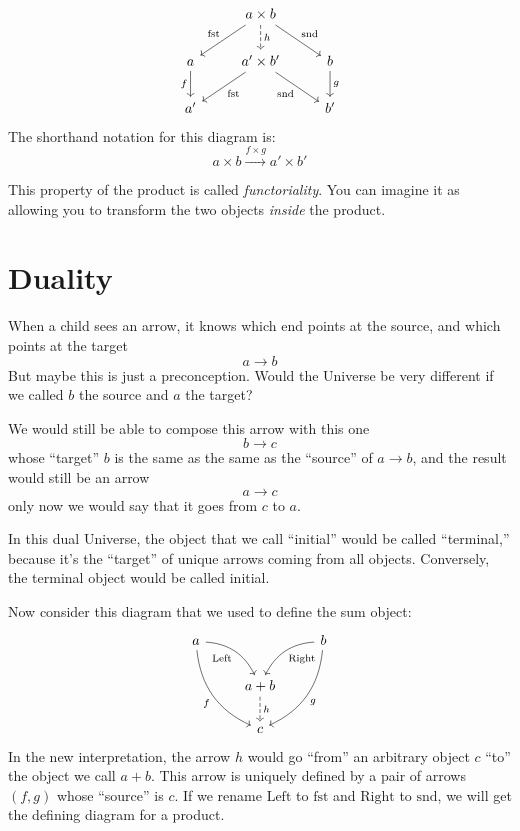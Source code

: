\documentclass[DaoFP]{subfiles}
\begin{document}
\[
 \begin{tikzcd}
 & a \times b
\arrow[d, dashed, "h"]
 \arrow[dl,  "\text{fst}"']
 \arrow[dr,   "\text{snd}"]
\\
a
\arrow[d, "f"']
&a' \times b'
 \arrow[dl,  "\text{fst}"]
  \arrow[dr,   "\text{snd}"']
& b
\arrow[d, "g"]
\\
a' && b'
 \end{tikzcd}
\]
The shorthand notation for this diagram is:
\[ a \times b \xrightarrow{f \times g} a' \times b' \]

This property of the product is called \emph{functoriality}. You can imagine it as allowing you to transform the two objects \emph{inside} the product. 

\section{Duality}

When a child sees an arrow, it knows which end points at the source, and which points at the target
\[a \to b \]
But maybe this is just a preconception. Would the Universe be very different if we called $b$ the source and $a$ the target? 

We would still be able to compose this arrow with this one
\[b \to c\]
whose ``target'' $b$ is the same as the same as the ``source'' of $a \to b$, and the result would still be an arrow 
\[a \to c\]
 only now we would say that it goes from $c$ to $a$.

In this dual Universe, the object that we call ``initial'' would be called ``terminal,'' because it's the ``target'' of unique arrows coming from all objects. Conversely, the terminal object would be called initial.

Now consider this diagram that we used to define the sum object:
\[
 \begin{tikzcd}
 a
 \arrow[dr,  bend left, "\text{Left}"']
 \arrow[ddr, bend right, "f"']
 && b
 \arrow[dl, bend right, "\text{Right}"]
 \arrow[ddl, bend left, "g"]
 \\
&a + b
\arrow[d, dashed, "h"]
\\
& c
 \end{tikzcd}
\]
In the new interpretation, the arrow $h$ would go ``from'' an arbitrary object $c$ ``to'' the object we call $a + b$. This arrow is uniquely defined by a pair of arrows $(f, g)$ whose ``source'' is $c$. If we rename $\text{Left}$ to $\text{fst}$ and $\text{Right}$ to $\text{snd}$, we will get  the defining diagram for a product. 
\end{document}
